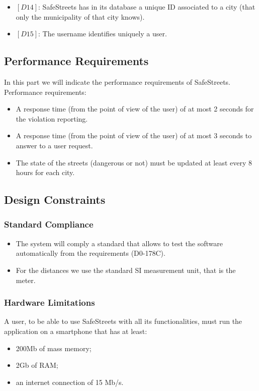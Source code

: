 \documentclass[titlepage]{article}
\begin{document}
\begin{itemize}
\begin{itemize}
 \item $[D14]$: SafeStreets has in its database a unique ID associated to a city (that only the municipality of that city knows).
 
 \item $[D15]$: The username identifies uniquely a user.
 \end{itemize}
 
 
\end{itemize}


\subsection{Performance Requirements}

In this part we will indicate the performance requirements of SafeStreets. Performance requirements:

\begin{itemize}
	\item A response time (from the point of view of the user) of at most 2 seconds for the violation reporting.
	\item A response time (from the point of view of the user) of at most 3 seconds to answer to a user request. 
	\item The state of the streets (dangerous or not) must be updated at least every 8 hours for each city.
\end{itemize}

\subsection{Design Constraints}
\subsubsection{Standard Compliance}
\begin{itemize}
\item The system will comply a standard that allows to test the software automatically from the requirements (D0-178C).
\item For the distances we use the standard SI measurement unit, that is the meter.
\end{itemize}

\subsubsection{Hardware Limitations}
A user, to be able to use SafeStreets with all its functionalities, must run the application on a smartphone that has at least:
\begin{itemize}
\item 200Mb of mass memory;
\item 2Gb of RAM;
\item an internet connection of 15 Mb/s.
\end{itemize}
 
\end{document}

